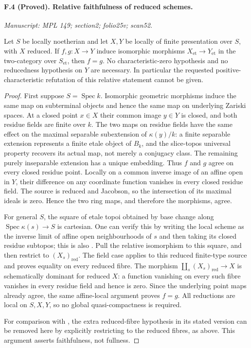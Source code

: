\paragraph{F.4 (Proved). Relative faithfulness of reduced schemes.}
\textit{Manuscript: MPL 149; section2; folio25v; scan52.}

Let $S$ be locally noetherian and let $X,Y$ be locally of finite
presentation over $S$, with $X$ reduced. If $f,g:X\to Y$ induce isomorphic
morphisms $X_{\mathrm{et}}\to Y_{\mathrm{et}}$ in the two-category over
$S_{\mathrm{et}}$, then $f=g$. No characteristic-zero hypothesis and no
reducedness hypothesis on $Y$ are necessary. In particular the requested
positive-characteristic refutation of this relative statement cannot be
given.

\begin{proof}
First suppose $S=\operatorname{Spec}k$. Isomorphic geometric morphisms
induce the same map on subterminal objects and hence the same map on
underlying Zariski spaces. At a closed point $x\in X$ their common image
$y\in Y$ is closed, and both residue fields are finite over $k$. The two
maps on residue fields have the same effect on the maximal separable
subextension of $\kappa(y)/k$: a finite separable extension represents a
finite etale object of $B_k$, and the slice-topos universal property
recovers its actual map, not merely a conjugacy class. The remaining
purely inseparable extension has a unique embedding. Thus $f$ and $g$
agree on every closed residue point. Locally on a common inverse image of
an affine open in $Y$, their difference on any coordinate function vanishes
in every closed residue field. The source is reduced and Jacobson, so the
intersection of its maximal ideals is zero. Hence the two ring maps, and
therefore the morphisms, agree.

For general $S$, the square of etale topoi obtained by base change along
$\operatorname{Spec}\kappa(s)\to S$ is cartesian. One can verify this by
writing the local scheme as the inverse limit of affine open
neighbourhoods of $s$ and then taking its closed residue subtopos; this is
also \cite[Lemma~2.9]{CHW2024}. Pull the relative isomorphism to this square,
and then restrict to $(X_s)_{\mathrm{red}}$. The field case applies to this
reduced finite-type source and proves equality on every reduced fibre.
The morphism
$\coprod_s(X_s)_{\mathrm{red}}\to X$ is schematically dominant for reduced
$X$: a function vanishing on every such fibre vanishes in every residue
field and hence is zero. Since the underlying point maps already agree,
the same affine-local argument proves $f=g$. All reductions are local on
$S,X,Y$, so no global quasi-compactness is required.

For comparison with \cite[Theorem~3.9]{CHW2024}, the extra reduced-fibre
hypothesis in its stated version can be removed here by explicitly
restricting to the reduced fibres, as above. This argument asserts
faithfulness, not fullness.
\end{proof}

